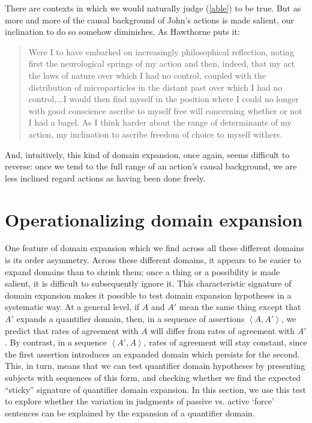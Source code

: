 \documentclass{salt}
\newcommand{\seq}[1]{\left\langle {#1} \right\rangle}
\newcommand{\reff}[1]{(\ref{#1})}
\begin{document}
\noindent  There are contexts in which we would naturally judge \reff{able} to be true. But as more and more of the causal background of John's actions is made salient, our inclination to do so somehow diminishes. As Hawthorne puts it: \begin{quote}Were I to have embarked on increasingly philosophical reflection, noting first the neurological springs of my action and then, indeed, that my act the laws of nature over which I had no control, coupled with the distribution of microparticles in the distant past over which I had no control,$\dots$I would then find myself in the position where I could no longer with good conscience ascribe to myself free will concerning whether or not I had a bagel. As I think harder about the range of determinants of my action, my inclination to ascribe freedom of choice to myself withers.\hfill \citealt[p. 66-67]{Hawthorne:2001}\end{quote}

\noindent And, intuitively, this kind of domain expansion, once again, seems difficult to reverse: once we tend to the full range of an action's causal background, we are less inclined regard actions as having been done freely. 


\section{Operationalizing domain expansion}

One feature of domain expansion which we find across all these different domains is its order asymmetry. Across these different domains, it appears to be easier to {expand} domains than to shrink them; once a thing or a possibility is made salient, it is difficult to subsequently ignore it. This characteristic signature of domain expansion makes it possible to test  domain expansion hypotheses in a systematic way. At a general level, if $A$ and $A'$ mean the same thing except that $A'$ expands a quantifier domain, then, in a sequence of assertions $\seq{A, A'}$, we predict that rates of agreement with $A$ will differ from rates of agreement with $A'$. By contrast, in a sequence $\seq{A',A}$, rates of agreement will stay constant, since the first assertion introduces an expanded domain which persists for the second. This, in turn, means that we can test quantifier domain hypotheses by presenting subjects with sequences of this form, and checking whether we find the expected ``sticky'' signature of quantifier domain expansion. In this section, we use this test to explore whether the variation in judgments of passive vs. active `force' sentences can be explained by the expansion of a quantifier domain.
\end{document}
